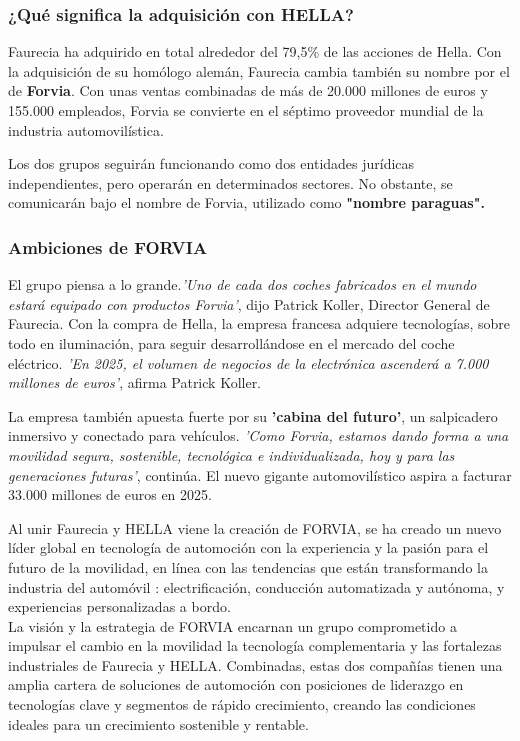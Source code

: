\documentclass[letterpaper,12pt]{article}
\begin{document}
\begin{sloppypar}
\subsubsection{¿Qué significa la adquisición con HELLA?}
Faurecia ha adquirido en total alrededor del 79,5\% de las acciones de Hella. Con la adquisición de su homólogo alemán, Faurecia cambia también su nombre por el de \textbf{Forvia}. Con unas ventas combinadas de más de 20.000 millones de euros y 155.000 empleados, Forvia se convierte en el séptimo proveedor mundial de la industria automovilística.

Los dos grupos seguirán funcionando como dos entidades jurídicas independientes, pero operarán en determinados sectores. No obstante, se comunicarán bajo el nombre de Forvia, utilizado como \textbf{"nombre paraguas".}

\subsubsection{Ambiciones de FORVIA}
El grupo piensa a lo grande.\textit{'Uno de cada dos coches fabricados en el mundo estará equipado con productos Forvia'}, dijo Patrick Koller, Director General de Faurecia. Con la compra de Hella, la empresa francesa adquiere tecnologías, sobre todo en iluminación, para seguir desarrollándose en el mercado del coche eléctrico. \textit{'En 2025, el volumen de negocios de la electrónica ascenderá a 7.000 millones de euros'}, afirma Patrick Koller.

La empresa también apuesta fuerte por su \textbf{'cabina del futuro'}, un salpicadero inmersivo y conectado para vehículos. \textit{'Como Forvia, estamos dando forma a una movilidad segura, sostenible, tecnológica e individualizada, hoy y para las generaciones futuras'}, continúa. El nuevo gigante automovilístico aspira a facturar 33.000 millones de euros en 2025.

Al unir Faurecia y HELLA viene la creación de FORVIA, se ha creado un nuevo líder global en tecnología de automoción con la experiencia y la pasión para el futuro de la movilidad, en línea con las tendencias que están transformando la industria del automóvil : electrificación, conducción automatizada y autónoma, y experiencias personalizadas a bordo.
\vspace{0.3cm}\\ 
La visión y la estrategia de FORVIA encarnan un grupo comprometido a impulsar el cambio en la movilidad la tecnología complementaria y las fortalezas industriales de Faurecia y HELLA. Combinadas, estas dos compañías tienen una amplia cartera de soluciones de automoción con posiciones de liderazgo en tecnologías clave y segmentos de rápido crecimiento, creando las condiciones ideales para un crecimiento sostenible y rentable. 


\end{sloppypar}
\end{document}
